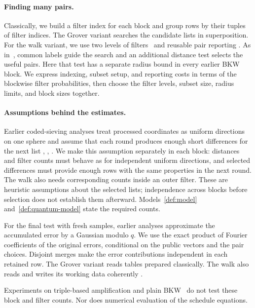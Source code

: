 \documentclass[runningheads,envcountsame,envcountsect,orivec]{llncs}
\begin{document}
\paragraph{Finding many pairs.}
Classically, we build a filter index for each block and group rows
by their tuples of filter indices. The Grover variant searches
the candidate lists in superposition. For the walk variant, we use
two levels of filters~\cite{CL21} and reusable pair reporting
\cite{BCSS23,BLSS25}. As in~\cite[Section~7.2]{BCSS23},
common labels guide the search and an additional distance test
selects the useful pairs. Here that test has a separate radius
bound in every earlier BKW block. We express indexing, subset setup, and reporting costs in terms of
the blockwise filter probabilities, then choose the filter levels,
subset size, radius limits, and block sizes together.

\paragraph{Assumptions behind the estimates.}
\label{sec:assumption-comparison}

Earlier coded-sieving analyses treat processed coordinates
as uniform directions on one sphere and assume that each
round produces enough short differences for the next list
\cite[Sections~2.3 and~5--6]{GJMS17},
\cite[Sections~II-C and~V-C--V-D]{GJMS19},
\cite[Section~V-C]{M19}. We make this assumption separately in
each block: distances and filter counts must behave as for
independent uniform directions, and selected differences must
provide enough rows with the same properties in the next round.
The walk also needs corresponding counts inside an outer filter.
These are heuristic assumptions about the selected lists;
independence across blocks before selection does not establish
them afterward. Models~\ref{def:model} and~\ref{def:quantum-model}
state the required counts.

For the final test with fresh samples, earlier analyses approximate the accumulated
error by a Gaussian modulo $q$. We use the exact product
of Fourier coefficients of the original errors, conditional
on the public vectors and the pair choices. Disjoint merges
make the error contributions independent in each retained
row. The Grover variant reads tables prepared classically.
The walk also reads and writes its working data coherently
\cite[Section~5]{BCSS23}.



Experiments on triple-based amplification and plain
BKW~\cite[Section~6.4]{GMW23} do not test these block and filter
counts. Nor does numerical evaluation of the schedule equations.
\end{document}
